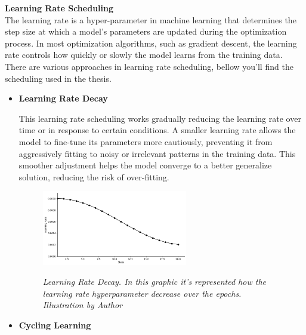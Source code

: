 \vspace{0.5cm}
\textbf{Learning Rate Scheduling} \\

The learning rate is a hyper-parameter in machine learning that determines the step size at which a model's parameters are updated during the optimization process. In most optimization algorithms, such as gradient descent, the learning rate controls how quickly or slowly the model learns from the training data. \\

There are various approaches in learning rate scheduling, bellow you'll find the scheduling used in the thesis.

\newpage

\begin{itemize}
    \item \textbf{Learning Rate Decay}
    
    This learning rate scheduling works gradually reducing the learning rate over time or in response to certain conditions. A smaller learning rate allows the model to fine-tune its parameters more cautiously, preventing it from aggressively fitting to noisy or irrelevant patterns in the training data. This smoother adjustment helps the model converge to a better generalize solution, reducing the risk of over-fitting. 
        
    \begin{figure}[H]
    \centering
    \includegraphics[width=0.6\textwidth]{imatges/preliminaries/learning-rate-decay.png}
    \caption[Learning Rate Decay]{\textit{Learning Rate Decay. In this graphic it's represented how the learning rate hyperparameter decrease over the epochs. Illustration by Author}}
    {\label{fig:learning-rate-decay}}
    \end{figure} 
    
    \item \textbf{Cycling Learning}
    

\end{itemize}
